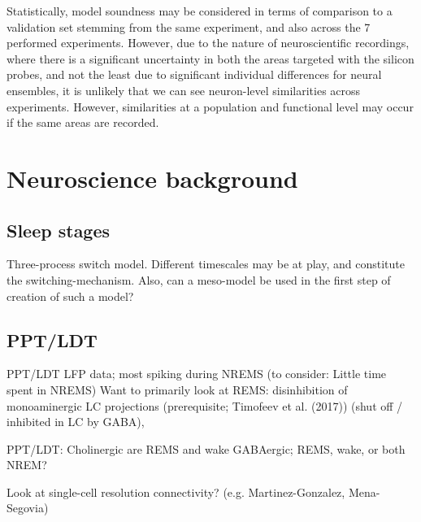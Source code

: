 \documentclass[mphil,deptreport,ai]{infthesis} %
\begin{document}
Statistically, model soundness may be considered in terms of comparison to a validation set stemming from the same experiment, and also across the 7 performed experiments. However, due to the nature of neuroscientific recordings, where there is a significant uncertainty in both the areas targeted with the silicon probes, and not the least due to significant individual differences for neural ensembles, it is unlikely that we can see neuron-level similarities across experiments. However, similarities at a population and functional level may occur if the same areas are recorded.




\section{Neuroscience background}

\subsection{Sleep stages}
Three-process switch model. Different timescales may be at play, and constitute the switching-mechanism.
Also, can a meso-model be used in the first step of creation of such a model?

\subsection{PPT/LDT}
PPT/LDT LFP data; most spiking during NREMS
(to consider: Little time spent in NREMS)
Want to primarily look at REMS: disinhibition of monoaminergic LC projections (prerequisite; Timofeev et al. (2017)) (shut off / inhibited in LC by GABA), 

PPT/LDT:
Cholinergic are REMS and wake
GABAergic; REMS, wake, or both
NREM?

Look at single-cell resolution connectivity? (e.g. Martinez-Gonzalez, Mena-Segovia)
\end{document}
